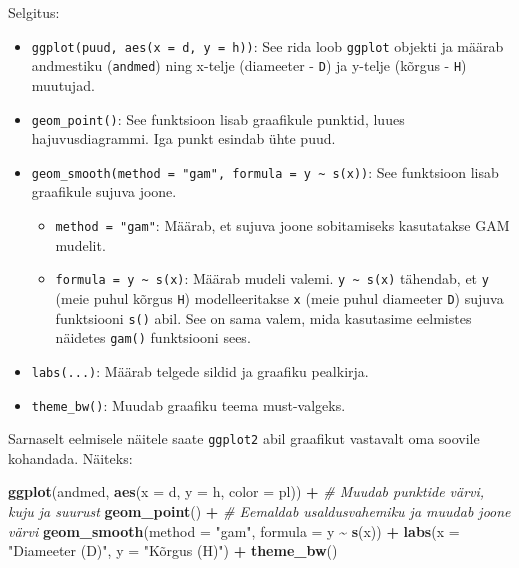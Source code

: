 \documentclass[
]{book}
\newenvironment{Shaded}{\begin{snugshade}}{\end{snugshade}}
\newcommand{\AttributeTok}[1]{\textcolor[rgb]{0.13,0.29,0.53}{#1}}
\newcommand{\CommentTok}[1]{\textcolor[rgb]{0.56,0.35,0.01}{\textit{#1}}}
\newcommand{\FunctionTok}[1]{\textcolor[rgb]{0.13,0.29,0.53}{\textbf{#1}}}
\newcommand{\NormalTok}[1]{#1}
\newcommand{\SpecialCharTok}[1]{\textcolor[rgb]{0.81,0.36,0.00}{\textbf{#1}}}
\newcommand{\StringTok}[1]{\textcolor[rgb]{0.31,0.60,0.02}{#1}}
\providecommand{\tightlist}{%
  \setlength{\itemsep}{0pt}\setlength{\parskip}{0pt}}
\renewenvironment{Shaded} {\begin{snugshade}\footnotesize} {\end{snugshade}}
\theoremstyle{definition}
\theoremstyle{definition}
\theoremstyle{definition}
\theoremstyle{definition}
\theoremstyle{remark}
\begin{document}
Selgitus:

\begin{itemize}
\tightlist
\item
  \texttt{ggplot(puud,\ aes(x\ =\ d,\ y\ =\ h))}: See rida loob \texttt{ggplot} objekti ja määrab andmestiku (\texttt{andmed}) ning x-telje (diameeter - \texttt{D}) ja y-telje (kõrgus - \texttt{H}) muutujad.
\item
  \texttt{geom\_point()}: See funktsioon lisab graafikule punktid, luues hajuvusdiagrammi. Iga punkt esindab ühte puud.
\item
  \texttt{geom\_smooth(method\ =\ "gam",\ formula\ =\ y\ \textasciitilde{}\ s(x))}: See funktsioon lisab graafikule sujuva joone.

  \begin{itemize}
  \tightlist
  \item
    \texttt{method\ =\ "gam"}: Määrab, et sujuva joone sobitamiseks kasutatakse GAM mudelit.
  \item
    \texttt{formula\ =\ y\ \textasciitilde{}\ s(x)}: Määrab mudeli valemi. \texttt{y\ \textasciitilde{}\ s(x)} tähendab, et \texttt{y} (meie puhul kõrgus \texttt{H}) modelleeritakse \texttt{x} (meie puhul diameeter \texttt{D}) sujuva funktsiooni \texttt{s()} abil. See on sama valem, mida kasutasime eelmistes näidetes \texttt{gam()} funktsiooni sees.
  \end{itemize}
\item
  \texttt{labs(...)}: Määrab telgede sildid ja graafiku pealkirja.
\item
  \texttt{theme\_bw()}: Muudab graafiku teema must-valgeks.
\end{itemize}

Sarnaselt eelmisele näitele saate \texttt{ggplot2} abil graafikut vastavalt oma soovile kohandada. Näiteks:

\begin{Shaded}
\begin{Highlighting}[]
\FunctionTok{ggplot}\NormalTok{(andmed, }\FunctionTok{aes}\NormalTok{(}\AttributeTok{x =}\NormalTok{ d, }\AttributeTok{y =}\NormalTok{ h, }\AttributeTok{color =}\NormalTok{ pl)) }\SpecialCharTok{+}
  \CommentTok{\# Muudab punktide värvi, kuju ja suurust}
  \FunctionTok{geom\_point}\NormalTok{() }\SpecialCharTok{+}  
  \CommentTok{\# Eemaldab usaldusvahemiku ja muudab joone värvi}
  \FunctionTok{geom\_smooth}\NormalTok{(}\AttributeTok{method =} \StringTok{"gam"}\NormalTok{, }\AttributeTok{formula =}\NormalTok{ y }\SpecialCharTok{\textasciitilde{}} \FunctionTok{s}\NormalTok{(x)) }\SpecialCharTok{+}  
  \FunctionTok{labs}\NormalTok{(}\AttributeTok{x =} \StringTok{"Diameeter (D)"}\NormalTok{, }\AttributeTok{y =} \StringTok{"Kõrgus (H)"}\NormalTok{) }\SpecialCharTok{+}
  \FunctionTok{theme\_bw}\NormalTok{()}
\end{Highlighting}
\end{Shaded}
\end{document}
